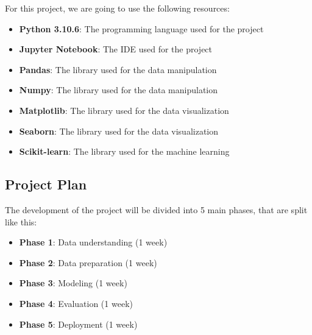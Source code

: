 For this project, we are going to use the following resources:

\begin{itemize}
    \item \textbf{Python 3.10.6}: The programming language used for the project
    \item \textbf{Jupyter Notebook}: The IDE used for the project
    \item \textbf{Pandas}: The library used for the data manipulation
    \item \textbf{Numpy}: The library used for the data manipulation
    \item \textbf{Matplotlib}: The library used for the data visualization
    \item \textbf{Seaborn}: The library used for the data visualization
    \item \textbf{Scikit-learn}: The library used for the machine learning 
\end{itemize}

\subsection{Project Plan}
\label{subsec:project_plan}

The development of the project will be divided into 5 main phases, that are split like this:

\begin{itemize}
    \item \textbf{Phase 1}: Data understanding (1 week)
    \item \textbf{Phase 2}: Data preparation (1 week)
    \item \textbf{Phase 3}: Modeling (1 week)
    \item \textbf{Phase 4}: Evaluation (1 week)
    \item \textbf{Phase 5}: Deployment (1 week)
\end{itemize}

